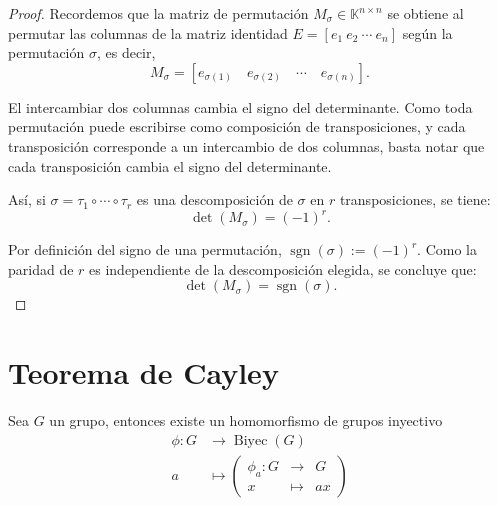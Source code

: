 \begin{proposicion}
\end{proposicion}

\begin{proof}
	Recordemos que la matriz de permutación \(M_\sigma \in \mathbb{K}^{n \times n}\) se obtiene al permutar las columnas de la matriz identidad \(E = [e_1 \ e_2 \ \cdots \ e_n]\) según la permutación \(\sigma\), es decir,
	\[
	M_\sigma = [e_{\sigma(1)} \quad e_{\sigma(2)} \quad \cdots \quad e_{\sigma(n)}].
	\]
	
	\medskip
	\noindent
	El intercambiar dos columnas cambia el signo del determinante. Como toda permutación puede escribirse como composición de transposiciones, y cada transposición corresponde a un intercambio de dos columnas, basta notar que cada transposición cambia el signo del determinante.
	
	\medskip
	\noindent
	Así, si \(\sigma = \tau_1 \circ \cdots \circ \tau_r\) es una descomposición de \(\sigma\) en \(r\) transposiciones, se tiene:
	\[
	\det(M_\sigma) = (-1)^r.
	\]
	
	\noindent
	Por definición del signo de una permutación, \(\operatorname{sgn}(\sigma) := (-1)^r\). Como la paridad de \(r\) es independiente de la descomposición elegida, se concluye que:
	\[
	\det(M_\sigma) = \operatorname{sgn}(\sigma).
	\]
\end{proof}













\section{Teorema de Cayley}

Sea $G$ un grupo, entonces existe un homomorfismo de grupos inyectivo 
\begin{align*}
	\phi: G &\longrightarrow \operatorname{Biyec}(G) \\
	a &\longmapsto \left(  
	\begin{array}{rcl}
		\phi_a:G &\to& G \\
		x &\mapsto& ax
	\end{array} \right)
\end{align*}





